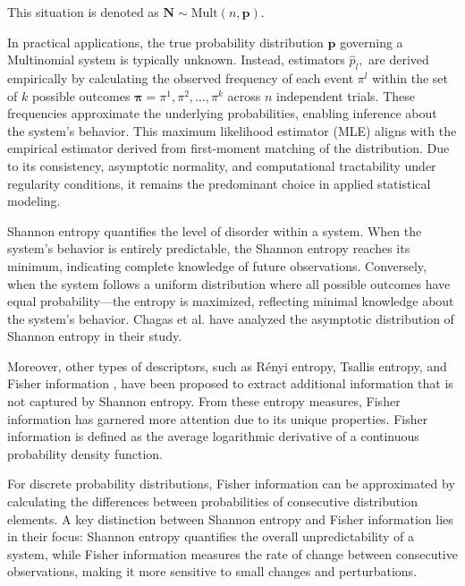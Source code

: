 This situation is denoted as $\bm{N}\sim \text{Mult}(n,\bm{p}).$ \cite{Rey2023}


In practical applications, the true probability distribution $\bm{p}$ governing a Multinomial system is typically unknown. Instead, estimators $\widehat{p}_l,$ are derived empirically by calculating the observed frequency of each event $\pi^l$ within the set of $k$ possible outcomes $\bm{\pi}=\pi^1,\pi^2, \dots, \pi^k$  across $n$ independent trials. These frequencies approximate the underlying probabilities, enabling inference about the system’s behavior. This maximum likelihood estimator (MLE) aligns with the empirical estimator derived from first-moment matching of the distribution. Due to its consistency, asymptotic normality, and computational tractability under regularity conditions, it remains the predominant choice in applied statistical modeling.

Shannon entropy quantifies the level of disorder within a system. When the system's behavior is entirely predictable, the Shannon entropy reaches its minimum, indicating complete knowledge of future observations. Conversely, when the system follows a uniform distribution where all possible outcomes have equal probability—the entropy is maximized, reflecting minimal knowledge about the system's behavior. Chagas et al. \cite{Chagas2022} have analyzed the asymptotic distribution of Shannon entropy in their study. 


Moreover, other types of descriptors, such as Rényi entropy\cite{renyi1961measures}, Tsallis entropy\cite{tsallis1988possible}, and Fisher information \cite{frieden2004science}, have been proposed to extract additional information that is not captured by Shannon entropy.
From these entropy measures, Fisher information has garnered more attention due to its unique properties. Fisher information is defined as the average logarithmic derivative of a continuous probability density function.

For discrete probability distributions, Fisher information can be approximated by calculating the differences between probabilities of consecutive distribution elements. A key distinction between Shannon entropy and Fisher information lies in their focus: Shannon entropy quantifies the overall unpredictability of a system, while Fisher information measures the rate of change between consecutive observations, making it more sensitive to small changes and perturbations.

